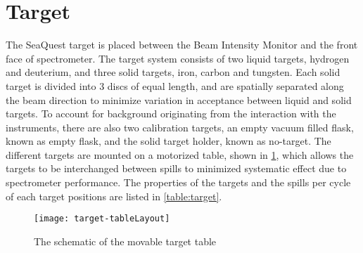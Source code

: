\documentclass[../main.tex]{subfiles}
\begin{document}
\section{Target}
The SeaQuest target is placed between the Beam Intensity Monitor and the front face
of spectrometer. The target system consists of two liquid targets, hydrogen and deuterium,
and three solid targets, iron, carbon and tungsten. Each solid target is divided
into \num{3} discs of equal length, and are spatially separated along the beam
direction to minimize variation in acceptance between liquid and solid targets.
To account for background originating from the interaction with the instruments,
there are also two calibration targets, an empty vacuum filled flask, known as
empty flask, and the solid target holder, known as no-target. The different targets
are mounted on a motorized table, shown in \cref{fig:target}, which allows the
targets to be interchanged between spills to minimized systematic effect due to
spectrometer performance. The properties of the targets and the spills per cycle
of each target positions are listed in \cref{table:target}.
\begin{figure}[htbp!]
	\centering
	\texttt{[image: target-tableLayout]}
	\caption{The schematic of the movable target table}
	\label{fig:target}
\end{figure}
\end{document}
